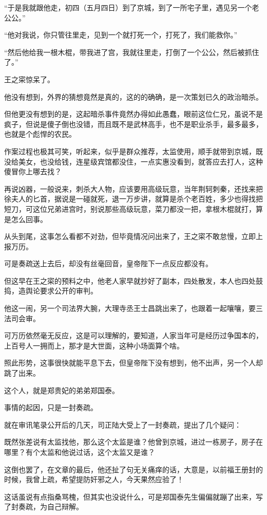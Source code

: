 \begin{multicols}{\theparacolNo}
“于是我就跟他走，初四（五月四日）到了京城，到了一所宅子里，遇见另一个老公公。”

“他对我说，你只管往里走，见到一个就打死一个，打死了，我们能救你。”

“然后他给我一根木棍，带我进了宫，我就往里走，打倒了一个公公，然后被抓住了。”

王之寀惊呆了。

他没有想到，外界的猜想竟然是真的，这的的确确，是一次策划已久的政治暗杀。

但他更没有想到的是，这起暗杀事件竟然办得如此愚蠢，眼前这位仁兄，虽说不是疯子，但说是傻子倒也没错，而且既不是武林高手，也不是职业杀手，最多最多，也就是个彪悍的农民。

作案过程也极其可笑，听起来，似乎是群众推荐，太监使用，顺手就带到京城，既没给美女，也没给钱，连星级宾馆都没住，一点实惠没看到，就答应去打人，这种傻冒你上哪去找？

再说凶器，一般说来，刺杀大人物，应该要用高级玩意，当年荆轲刺秦，还找来把徐夫人的匕首，据说是一碰就死，退一万步讲，就算是杀个老百姓，多少也得找把短刀，可这位兄弟进宫时，别说那些高级玩意，菜刀都没一把，拿根木棍就打，算是怎么回事。

从头到尾，这事怎么看都不对劲，但毕竟情况问出来了，王之寀不敢怠慢，立即上报万历。

可是奏疏送上去后，却没有丝毫回音，皇帝陛下一点反应都没有。

但这早在王之寀的预料之中，他老人家早就抄好了副本，四处散发，本人也四处鼓捣，造舆论要求公开的审判。

他这一闹，另一个司法界大腕，大理寺丞王士昌跳出来了，也跟着一起嚷嚷，要三法司会审。

可万历依然毫无反应，这是可以理解的，要知道，人家当年可是经历过争国本的，上百号人一拥而上，那才是大世面，这种小场面算个啥。

照此形势，这事很快就能平息下去，但皇帝陛下没有想到，他不出声，另一个人却跳了出来。

这个人，就是郑贵妃的弟弟郑国泰。

事情的起因，只是一封奏疏。

就在审讯笔录公开后的几天，司正陆大受上了一封奏疏，提出了几个疑问：

既然张差说有太监找他，那么这个太监是谁？他曾到京城，进过一栋房子，房子在哪里？有个太监和他说过话，这个太监又是谁？

这倒也罢了，在文章的最后，他还扯了句无关痛痒的话，大意是，以前福王册封的时候，我曾上疏，希望提防奸邪之人，今天果然应验了！

这话虽说有点指桑骂槐，但其实也没说什么，可是郑国泰先生偏偏就蹦了出来，写了封奏疏，为自己辩解。


\end{multicols}
